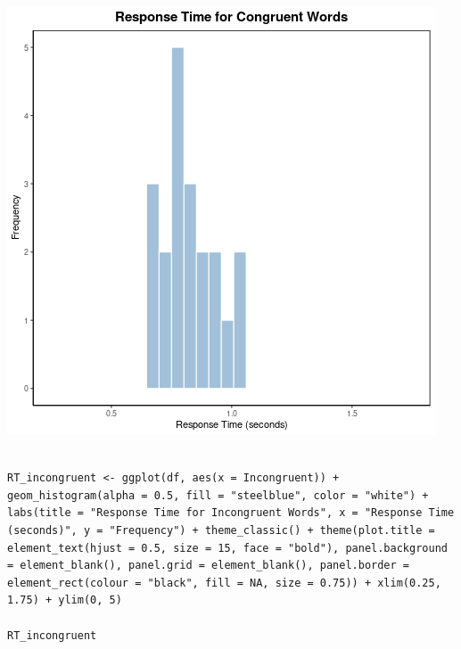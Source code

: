 \documentclass{article}
\begin{document}
\begin{center}
\includegraphics[width=.9\linewidth]{converted_stroop5.png}
\end{center}



\begin{verbatim}

RT_incongruent <- ggplot(df, aes(x = Incongruent)) + geom_histogram(alpha = 0.5, fill = "steelblue", color = "white") + labs(title = "Response Time for Incongruent Words", x = "Response Time (seconds)", y = "Frequency") + theme_classic() + theme(plot.title = element_text(hjust = 0.5, size = 15, face = "bold"), panel.background = element_blank(), panel.grid = element_blank(), panel.border = element_rect(colour = "black", fill = NA, size = 0.75)) + xlim(0.25, 1.75) + ylim(0, 5)

RT_incongruent

\end{verbatim}
\end{document}
